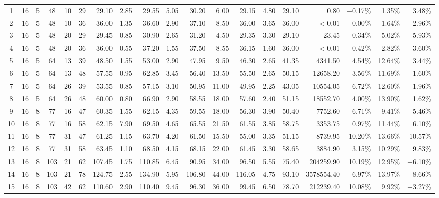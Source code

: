 \documentclass[review,3p,times,12pt,number]{elsarticle}\usepackage{amsmath}\usepackage{amssymb}
\begin{document}
\begin{landscape}
\begin{table}[htbp]
\begin{tabular}{ccccccrrrrrrrrrrrrr}
1 & 16 & 5 & 48  & 10 & 29 & 29.10  & 2.85 & 29.55  & 5.05  & 30.20 & 6.00  & 29.15 & 4.80   & 29.10 & 0.80      &$-$0.17\% &1.35\%   & 3.48\%\\
2 & 16 & 5 & 48  & 10 & 36 & 36.00  & 1.35 & 36.60  & 2.90  & 37.10 & 8.50  & 36.00 & 3.65   & 36.00 & $<0.01$   &0.00\%       &1.64\%   & 2.96\%\\
3 & 16 & 5 & 48  & 20 & 29 & 29.45  & 0.85 & 30.90  & 2.65  & 31.20 & 4.50  & 29.35 & 3.30   & 29.10 & 23.45     &0.34\%  &5.02\%   & 5.93\%\\
4 & 16 & 5 & 48  & 20 & 36 & 36.00  & 0.55 & 37.20  & 1.55  & 37.50 & 8.55  & 36.15 & 1.60   & 36.00 & $<0.01$   &$-$0.42\% &2.82\%   & 3.60\%\\
5 & 16 & 5 & 64  & 13 & 39 & 48.50  & 1.55 & 53.00  & 2.90  & 47.95 & 9.50  & 46.30 & 2.65   & 41.35 & 4341.50   &4.54\%  &12.64\%  & 3.44\%\\
6 & 16 & 5 & 64  & 13 & 48 & 57.55  & 0.95 & 62.85  & 3.45  & 56.40 & 13.50 & 55.50 & 2.65   & 50.15 & 12658.20  &3.56\%  & 11.69\% & 1.60\%\\
7 & 16 & 5 & 64  & 26 & 39 & 53.55  & 0.85 & 57.15  & 3.10  & 50.95 & 11.00 &49.95  & 2.25   & 43.05 & 10554.05  &6.72\%  & 12.60\%  & 1.96\%\\
8 & 16 & 5 & 64  & 26 & 48 & 60.00  & 0.80 & 66.90  & 2.90  & 58.55 & 18.00 &57.60  & 2.40   & 51.15 & 18552.70  &4.00\%     & 13.90\%  & 1.62\%\\
9 & 16 & 8 & 77  & 16 & 47 & 60.35  & 1.55 & 62.15  & 4.35  & 59.55 & 18.00 &56.30  & 3.90   & 50.40 & 7752.60   &6.71\%  & 9.41\%  & 5.46\%\\
10& 16 & 8 & 77  & 16 & 58 & 62.15  & 7.90 & 69.50  & 4.65  & 65.55 & 21.50 &61.55  & 3.85   & 58.75 & 3353.75   &0.97\%  &11.44\%  & 6.10\%\\
11& 16 & 8 & 77  & 31 & 47 & 61.25  & 1.15 & 63.70  & 4.20  & 61.50 & 15.50 &55.00  & 3.35   & 51.15 & 8739.95   &10.20\%  & 13.66\% & 10.57\%\\
12& 16 & 8 & 77  & 31 & 58 & 63.45  & 1.10 & 68.50  & 4.15  & 68.15 & 22.00 &61.45  & 3.30   & 58.65 & 3884.90   &3.15\%  & 10.29\% & 9.83\%\\
13& 16 & 8 & 103 & 21 & 62 & 107.45 & 1.75 & 110.85 & 6.45  & 90.95 & 34.00 &96.50  & 5.55   & 75.40 & 204259.90 &10.19\% & 12.95\% & $-$6.10\%\\
14& 16 & 8 & 103 & 21 & 78 & 124.75 & 2.55 & 134.90 & 5.95  & 106.80& 44.00 &116.05 & 4.75   & 93.10 & 3578554.40&6.97\%  & 13.97\% & $-$8.66\%\\
15& 16 & 8 & 103 & 42 & 62 & 110.60 & 2.90 & 110.40 & 9.45  & 96.30 & 36.00 &99.45  & 6.50   & 78.70 & 212239.40 &10.08\% & 9.92\%  & $-$3.27\%\\

\end{tabular}
\end{table}
\end{landscape}
\end{document}
